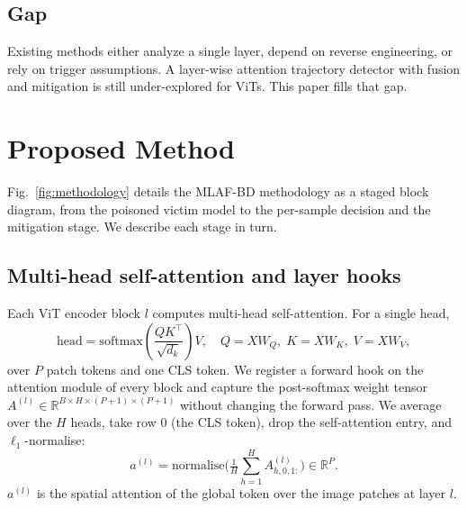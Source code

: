 \documentclass[journal]{IEEEtran}
\begin{document}
\subsection{Gap}
Existing methods either analyze a single layer, depend on reverse engineering,
or rely on trigger assumptions. A layer-wise attention trajectory detector with
fusion and mitigation is still under-explored for ViTs. This paper fills that
gap.

\section{Proposed Method}

Fig.~\ref{fig:methodology} details the MLAF-BD methodology as a staged block
diagram, from the poisoned victim model to the per-sample decision and the
mitigation stage. We describe each stage in turn.

\subsection{Multi-head self-attention and layer hooks}
Each ViT encoder block $l$ computes multi-head self-attention. For a single
head,
\begin{equation}
\mathrm{head}=\mathrm{softmax}\!\left(\frac{QK^\top}{\sqrt{d_k}}\right)V,
\quad Q=XW_Q,\;K=XW_K,\;V=XW_V,
\end{equation}
over $P$ patch tokens and one CLS token. We register a forward hook on the
attention module of every block and capture the post-softmax weight tensor
$A^{(l)}\in\mathbb{R}^{B\times H\times(P+1)\times(P+1)}$ without changing the
forward pass. We average over the $H$ heads, take row $0$ (the CLS token), drop
the self-attention entry, and $\ell_1$-normalise:
\begin{equation}
a^{(l)}=\text{normalise}\Big(\tfrac{1}{H}\textstyle\sum_{h=1}^{H}A^{(l)}_{h,0,1:}\Big)\in\mathbb{R}^{P}.
\end{equation}
$a^{(l)}$ is the spatial attention of the global token over the image patches at
layer $l$.
\end{document}
